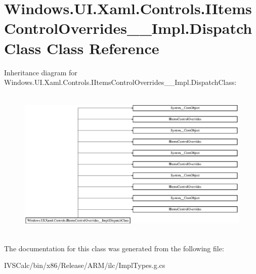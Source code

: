 \hypertarget{class_windows_1_1_u_i_1_1_xaml_1_1_controls_1_1_i_items_control_overrides_____impl_1_1_dispatch_class}{}\section{Windows.\+U\+I.\+Xaml.\+Controls.\+I\+Items\+Control\+Overrides\+\_\+\+\_\+\+Impl.\+Dispatch\+Class Class Reference}
\label{class_windows_1_1_u_i_1_1_xaml_1_1_controls_1_1_i_items_control_overrides_____impl_1_1_dispatch_class}
Inheritance diagram for Windows.\+U\+I.\+Xaml.\+Controls.\+I\+Items\+Control\+Overrides\+\_\+\+\_\+\+Impl.\+Dispatch\+Class\+:\begin{figure}[H]
\begin{center}
\leavevmode
\includegraphics[height=7.315915cm]{class_windows_1_1_u_i_1_1_xaml_1_1_controls_1_1_i_items_control_overrides_____impl_1_1_dispatch_class}
\end{center}
\end{figure}


The documentation for this class was generated from the following file\+:\begin{DoxyCompactItemize}
\item 
I\+V\+S\+Calc/bin/x86/\+Release/\+A\+R\+M/ilc/Impl\+Types.\+g.\+cs\end{DoxyCompactItemize}
